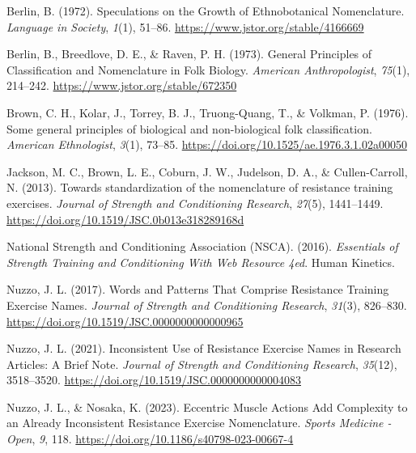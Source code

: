\documentclass[
]{article}
\newlength{\cslhangindent}
\newenvironment{CSLReferences}[2] %
 {\begin{list}{}{%
  \setlength{\itemindent}{0pt}
  \setlength{\leftmargin}{0pt}
  \setlength{\parsep}{0pt}
  \ifodd #1
   \setlength{\leftmargin}{\cslhangindent}
   \setlength{\itemindent}{-1\cslhangindent}
  \fi
  \setlength{\itemsep}{#2\baselineskip}}}
 {\end{list}}
\begin{document}
\protect{}\label{refs}
\begin{CSLReferences}{1}{0}
Berlin, B. (1972). Speculations on the {Growth} of {Ethnobotanical
Nomenclature}. \emph{Language in Society}, \emph{1}(1), 51--86.
\url{https://www.jstor.org/stable/4166669}

Berlin, B., Breedlove, D. E., \& Raven, P. H. (1973). General
{Principles} of {Classification} and {Nomenclature} in {Folk Biology}.
\emph{American Anthropologist}, \emph{75}(1), 214--242.
\url{https://www.jstor.org/stable/672350}

Brown, C. H., Kolar, J., Torrey, B. J., Truong-Quang, T., \& Volkman, P.
(1976). Some general principles of biological and non-biological folk
classification. \emph{American Ethnologist}, \emph{3}(1), 73--85.
\url{https://doi.org/10.1525/ae.1976.3.1.02a00050}

Jackson, M. C., Brown, L. E., Coburn, J. W., Judelson, D. A., \&
Cullen-Carroll, N. (2013). Towards standardization of the nomenclature
of resistance training exercises. \emph{Journal of Strength and
Conditioning Research}, \emph{27}(5), 1441--1449.
\url{https://doi.org/10.1519/JSC.0b013e318289168d}

National Strength and Conditioning Association (NSCA). (2016).
\emph{Essentials of {Strength Training} and {Conditioning With Web
Resource} 4ed}. Human Kinetics.

Nuzzo, J. L. (2017). Words and {Patterns That Comprise Resistance
Training Exercise Names}. \emph{Journal of Strength and Conditioning
Research}, \emph{31}(3), 826--830.
\url{https://doi.org/10.1519/JSC.0000000000000965}

Nuzzo, J. L. (2021). Inconsistent {Use} of {Resistance Exercise Names}
in {Research Articles}: {A Brief Note}. \emph{Journal of Strength and
Conditioning Research}, \emph{35}(12), 3518--3520.
\url{https://doi.org/10.1519/JSC.0000000000004083}

Nuzzo, J. L., \& Nosaka, K. (2023). Eccentric {Muscle Actions Add
Complexity} to an {Already Inconsistent Resistance Exercise
Nomenclature}. \emph{Sports Medicine - Open}, \emph{9}, 118.
\url{https://doi.org/10.1186/s40798-023-00667-4}


\end{CSLReferences}
\end{document}
